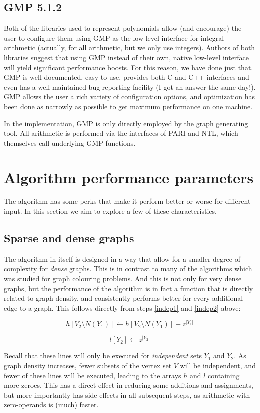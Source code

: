 \documentclass[a4paper]{article}
\begin{document}
\subsection{GMP 5.1.2}
Both of the libraries used to represent polynomials allow (and encourage) the user to configure them using GMP \cite{gmp} as the low-level interface for integral arithmetic (actually, for all arithmetic, but we only use integers). Authors of both libraries suggest that using GMP instead of their own, native low-level interface will yield significant performance boosts. For this reason, we have done just that. GMP is well documented, easy-to-use, provides both C and C++ interfaces and even has a well-maintained bug reporting facility (I got an answer the same day!). GMP allows the user a rich variety of configuration options, and optimization has been done as narrowly as possible to get maximum performance on one machine.

In the implementation, GMP is only directly employed by the graph generating tool. All arithmetic is performed via the interfaces of PARI and NTL, which themselves call underlying GMP functions.

\section{Algorithm performance parameters}
The algorithm has some perks that make it perform better or worse for different input. In this section we aim to explore a few of these characteristics.

\subsection{Sparse and dense graphs}\label{sparsedense}
The algorithm in itself is designed in a way that allow for a smaller degree of complexity for \emph{dense} graphs. This is in contrast to many of the algorithms which was studied for graph colouring problems. And this is not only for very dense graphs, but the performance of the algorithm is in fact a function that is directly related to graph density, and consistently performs better for every additional edge to a graph. This follows directly from steps \ref{indep1} and \ref{indep2} above:

$$ h[V_2 \setminus N(Y_1)] \leftarrow h[V_2 \setminus N(Y_1)] + z^{|Y_1|} $$

$$ l[Y_2] \leftarrow z^{|Y_2|} $$

Recall that these lines will only be executed for \emph{independent} sets $Y_1$ and $Y_2$. As graph density increases, fewer subsets of the vertex set $V$ will be independent, and fewer of these lines will be executed, leading to the arrays $h$ and $l$ containing more zeroes. This has a direct effect in reducing some additions and assignments, but more importantly has side effects in all subsequent steps, as arithmetic with zero-operands is (much) faster.
\end{document}
